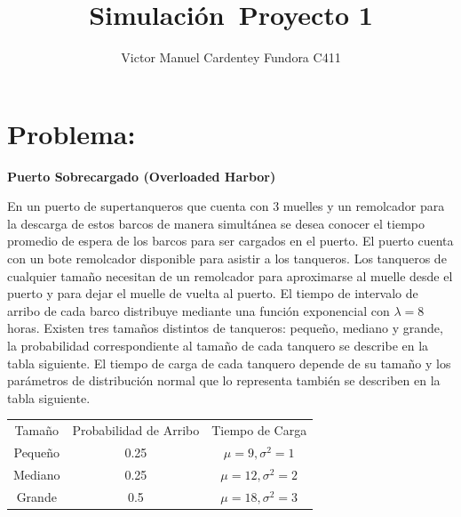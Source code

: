 \documentclass[titlepage,11pt]{scrartcl}
\title{	
    \normalfont\normalsize
	\vspace{25pt}
	{\huge Simulación\ Proyecto 1}
	\vspace{12pt}
}
\author{\LARGE Victor Manuel Cardentey Fundora C411}
\date{}
\begin{document}
\maketitle

\section{Problema:}

	\textbf{Puerto Sobrecargado (Overloaded Harbor)}

	En un puerto de supertanqueros que cuenta con 3 muelles y un remolcador para la descarga de estos barcos de manera simultánea se desea conocer el tiempo promedio de espera de los barcos para ser cargados en el puerto. El puerto cuenta con un bote remolcador disponible para asistir a los tanqueros. Los tanqueros de cualquier tamaño necesitan de un remolcador para aproximarse al muelle desde el puerto y para dejar el muelle de vuelta al puerto. El tiempo de intervalo de arribo de cada barco distribuye mediante una función exponencial con $\lambda = 8$ horas. Existen tres tamaños distintos de tanqueros: pequeño, mediano y grande, la probabilidad correspondiente al tamaño de cada tanquero se describe en la tabla siguiente. El tiempo de carga de cada tanquero depende de su tamaño y los parámetros de distribución normal que lo representa también se describen en la tabla siguiente.

	\begin{center}
		\begin{tabular}
			{c c c}
			\rule[-1ex]{0pt}{1.5ex} Tamaño & Probabilidad de Arribo & Tiempo de Carga \\
			\rule[-1ex]{0pt}{1.5ex} Pequeño & 0.25 & $\mu = 9, \sigma^2 = 1$ \\
			\rule[-1ex]{0pt}{1.5ex} Mediano & 0.25 & $\mu = 12, \sigma^2 = 2$ \\
			\rule[-1ex]{0pt}{1.5ex} Grande & 0.5 & $\mu = 18, \sigma^2 = 3$ \\
		\end{tabular}
	\end{center}
\end{document}
